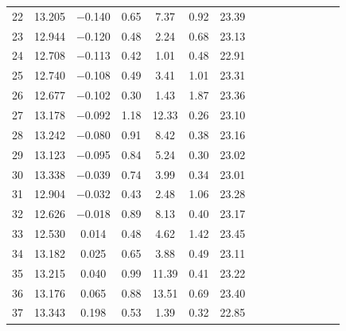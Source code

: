 \documentclass[11pt]{article}
\begin{document}
\begin{table}[htbp]
{\begin{tabular}{lcccccccccccccc}
  22 & 13.205 & $-$0.140 &   0.65 &    7.37 &	0.92 &   23.39 \\
  23 & 12.944 & $-$0.120 &   0.48 &    2.24 &	0.68 &   23.13 \\
  24 & 12.708 & $-$0.113 &   0.42 &    1.01 &	0.48 &   22.91 \\
  25 & 12.740 & $-$0.108 &   0.49 &    3.41 &	1.01 &   23.31 \\
  26 & 12.677 & $-$0.102 &   0.30 &    1.43 &	1.87 &   23.36 \\
  27 & 13.178 & $-$0.092 &   1.18 &   12.33 &	0.26 &   23.10 \\
  28 & 13.242 & $-$0.080 &   0.91 &    8.42 &	0.38 &   23.16 \\
  29 & 13.123 & $-$0.095 &   0.84 &    5.24 &	0.30 &   23.02 \\
  30 & 13.338 & $-$0.039 &   0.74 &    3.99 &	0.34 &   23.01 \\
  31 & 12.904 & $-$0.032 &   0.43 &    2.48 &	1.06 &   23.28 \\
  32 & 12.626 & $-$0.018 &   0.89 &    8.13 &	0.40 &   23.17 \\
  33 & 12.530 &    0.014 &   0.48 &    4.62 &	1.42 &   23.45 \\
  34 & 13.182 &    0.025 &   0.65 &    3.88 &	0.49 &   23.11 \\
  35 & 13.215 &    0.040 &   0.99 &   11.39 &	0.41 &   23.22 \\
  36 & 13.176 &    0.065 &   0.88 &   13.51 &	0.69 &   23.40 \\
  37 & 13.343 &    0.198 &   0.53 &    1.39 &	0.32 &   22.85 \\
\hline          
\end{tabular}
}
\end{table}
\end{document}
